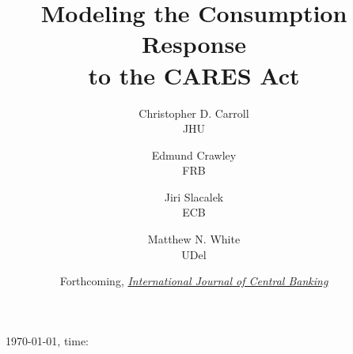 \documentclass[titlepage,a4paper]{\econtex}
\providecommand{\versn}{}
\renewcommand{\forcedate}{Forthcoming, \href{https://www.ijcb.org/}{\textit{International Journal of Central Banking}}}
\begin{document}
\hfill{\tiny \jobname~\versn~\today, time:\DTMcurrenttime}

\title{Modeling the Consumption Response\\ to the CARES Act}

{%
  \author{
    Christopher D. Carroll\authNum \\ {\small JHU}
    \and
    Edmund Crawley\authNum   \\ {\small FRB}
    \and
    Jiri Slacalek\authNum    \\ {\small ECB}
    \and
    Matthew N. White\authNum \\ {\small UDel}
  }
} %

  
\date{\forcedate}
\maketitle

\hypertarget{links}{}

\newcommand{\dashtarg}{Live Dashboard}
\newcommand{\htmltarg}{econ-ark.github.io/Pandemic}
\newcommand{\githtarg}{github.com/econ-ark/Pandemic}
\newcommand{\zipftarg}{zip~file:~~root~of~repo}
\newcommand{\latetarg}{LaTeX~directory~in~repo}
\newcommand{\subttarg}{LaTeX~directory~in~repo}

\newcommand{\githrepo}{\href{https://github.com/econ-ark/Pandemic}{\githtarg}}
\newcommand{\githtext}{Full codebase: Modify combos of assumptions}
\newcommand{\zipftext}{contains full replication files (code+text)}
\newcommand{\dashlive}{\href{https://econ-ark.org/materials/pandemic\#dashboard}{\dashtarg}}
\newcommand{\dashtext}{See effect of modifying main assumptions}
\newcommand{\htmlvers}{\href{https://econ-ark.github.io/Pandemic}{\htmltarg}}
\newcommand{\htmltext}{HTML version of paper}
\newcommand{\pdfltsub}{\href{https://github.com/econ-ark/Pandemic/blob/master/LaTeX/ConsumptionResponse.pdf}{\latetarg}}
\newcommand{\pdflttxt}{PDF~version~of~paper}
\newcommand{\slidesub}{\href{https://github.com/econ-ark/Pandemic/blob/master/LaTeX/ConsumptionResponse-Slides.pdf}{\subttarg}}
\newcommand{\slidetxt}{Presentation slides}
\newcommand{\bibtlink}{\href{https://raw.githubusercontent.com/econ-ark/Pandemic/gh-pages/LaTeX/ConsumptionResponse-Self.bib}{\subttarg}}
\newcommand{\bibttext}{Preferred BibTeX citation}
\newcommand{\zipflink}{\href{https://github.com/econ-ark/Pandemic/raw/master/ConsumptionResponse.zip  }{\zipftarg}}
\end{document}
